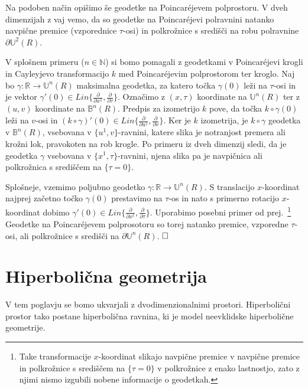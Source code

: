 \documentclass[a4paper]{article}
\def\qed{$\hfill\Box$}   %
\begin{document}
Na podoben način opišimo še geodetke na Poincar\'ejevem polprostoru.
V dveh dimenzijah z vaj vemo, da so geodetke na Poincar\'ejevi polravnini natanko navpične premice (vzporednice $\tau$-osi) in polkrožnice s središči na robu polravnine $\partial \mathbb{U}^{2}(R)$.

V splošnem primeru ($n \in \mathbb{N}$) si bomo pomagali z geodetkami v Poincar\'ejevi krogli in Cayleyjevo transformacijo $k$ med Poincar\'ejevim polprostorom ter kroglo.
%
Naj bo $\gamma \colon \mathbb{R} \to \mathbb{U}^{n}(R)$ maksimalna geodetka, za katero točka $\gamma(0)$ leži na $\tau$-osi in je vektor $\gamma'(0) \in \mathit{Lin} \{ \frac{\partial}{\partial x^{1}}, \frac{\partial}{\partial \tau} \}$.
Označimo z $(x,\tau)$ koordinate na $\mathbb{U}^{n}(R)$ ter z $(u,v)$ koordinate na $\mathbb{B}^{n}(R)$. Predpis za izometrijo $k$ pove, da točka $k \circ \gamma (0)$ leži na $v$-osi in $(k \circ \gamma)'(0) \in \mathit{Lin} \{ \frac{\partial}{\partial u^{1}}, \frac{\partial}{\partial v} \}$.
Ker je $k$ izometrija, je $k \circ \gamma$ geodetka v $\mathbb{B}^{n}(R)$, vsebovana v $\{u^{1},v \}$-ravnini, katere slika je notranjost premera ali krožni lok, pravokoten na rob krogle. Po primeru iz dveh dimenzij sledi, da je geodetka $\gamma$ vsebovana v $\{ x^{1}, \tau \}$-ravnini, njena slika pa je navpičnica ali polkrožnica s središčem na $\{ \tau = 0 \}$.

Splošneje, vzemimo poljubno geodetko $\gamma \colon \mathbb{R} \to \mathbb{U}^{n}(R)$. S translacijo $x$-koordinat najprej začetno točko $\gamma (0)$ prestavimo na $\tau$-os in nato s primerno rotacijo $x$-koordinat dobimo $\gamma'(0) \in \textit{Lin} \{ \frac{\partial}{\partial x^{1}}, \frac{\partial}{\partial \tau} \}$.
Uporabimo posebni primer od prej.~\footnote{Take transformacije $x$-koordinat slikajo navpične premice v navpične premice in polkrožnice s središčem na $\{ \tau =0 \}$ v polkrožnice z enako lastnostjo, zato z njimi nismo izgubili nobene informacije o geodetkah.}
Geodetke na Poincar\'ejevem polprosotoru so torej natanko premice, vzporedne $\tau$-osi, ali polkrožnice s središči na $\partial \mathbb{U}^{n}(R)$.
\qed

\section{Hiperbolična geometrija}

V tem poglavju se bomo ukvarjali z dvodimenzionalnimi prostori. Hiperbolični prostor tako postane hiperbolična ravnina, ki je model neevklidske hiperbolične geometrije.
\end{document}

